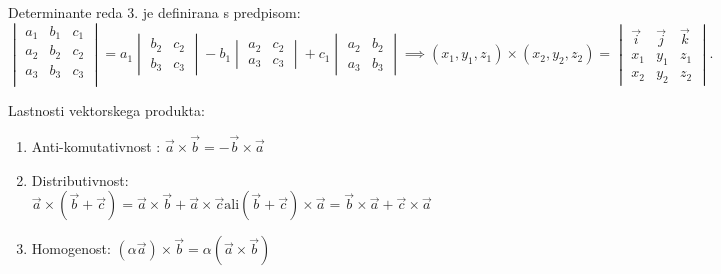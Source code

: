 \documentclass{report}
\begin{document}
Determinante reda 3. je definirana s predpisom:
\[
\begin{vmatrix}
	a_1 & b_1 & c_1 \\
	a_2 & b_2 & c_2 \\
	a_3 & b_3 & c_3 \\

\end{vmatrix}
= a_1
\begin{vmatrix}
	b_2 & c_2  \\
	b_3 & c_3

\end{vmatrix}
- b_1
\begin{vmatrix}
	a_2 & c_2 \\
	a_3 & c_3

\end{vmatrix}
+ c_1
\begin{vmatrix}
	a_2 & b_2 \\
	a_3 & b_3

\end{vmatrix}
\implies (x_1, y_1, z_1) \times (x_2, y_2, z_2) =
\begin{vmatrix}
	\vec{i} & \vec{j} & \vec{k} \\
	x_1 & y_1 & z_1 \\
	x_2 & y_2 & z_2
\end{vmatrix}
.\]


Lastnosti vektorskega produkta:
\begin{enumerate}
	\item Anti-komutativnost : $\vec{a} \times \vec{b} = - \vec{b} \times \vec{a}$
	\item Distributivnost: $\vec{a} \times (\vec{b} + \vec{c}) = \vec{a} \times \vec{b} + \vec{a} \times \vec{c} \text{ali} (\vec{b} + \vec{c}) \times \vec{a} = \vec{b} \times \vec{a} + \vec{c} \times \vec{a}$
	\item Homogenost: $(\alpha \vec{a}) \times \vec{b} = \alpha (\vec{a} \times \vec{b})$
\end{enumerate}


\end{document}
